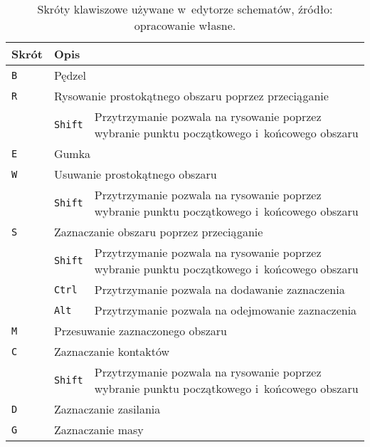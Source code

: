 \begin{table}[h]
    \centering
    \caption[Skróty klawiszowe używane w~edytorze schematów.]
    {Skróty klawiszowe używane w~edytorze schematów, źródło: opracowanie własne.}
    \label{tab:key_shortcuts}
    \begin{tabular}{|l||l|p{}|}
        \hline
        Skrót & \multicolumn{2}{|l|}{Opis} \\
        \hline
        \hline
        \texttt{B} & \multicolumn{2}{|l|}{Pędzel} \\
        \hline
        \texttt{R} & \multicolumn{2}{|l|}{Rysowanie prostokątnego obszaru poprzez przeciąganie} \\
        \cline{2-3}
        & \texttt{Shift} & Przytrzymanie pozwala na rysowanie poprzez wybranie punktu początkowego i~końcowego obszaru \\
        \hline
        \texttt{E} & \multicolumn{2}{|l|}{Gumka} \\
        \hline
        \texttt{W} & \multicolumn{2}{|l|}{Usuwanie prostokątnego obszaru} \\
        \cline{2-3}
        & \texttt{Shift} & Przytrzymanie pozwala na rysowanie poprzez wybranie punktu początkowego i~końcowego obszaru \\
        \hline
        \texttt{S} & \multicolumn{2}{|l|}{Zaznaczanie obszaru poprzez przeciąganie} \\
        \cline{2-3}
        & \texttt{Shift} & Przytrzymanie pozwala na rysowanie poprzez wybranie punktu początkowego i~końcowego obszaru \\
        \cline{2-3}
        & \texttt{Ctrl} & Przytrzymanie pozwala na dodawanie zaznaczenia \\
        \cline{2-3}
        & \texttt{Alt} & Przytrzymanie pozwala na odejmowanie zaznaczenia \\
        \hline
        \texttt{M} & \multicolumn{2}{|l|}{Przesuwanie zaznaczonego obszaru} \\
        \hline
        \texttt{C} & \multicolumn{2}{|l|}{Zaznaczanie kontaktów} \\
        \cline{2-3}
        & \texttt{Shift} & Przytrzymanie pozwala na rysowanie poprzez wybranie punktu początkowego i~końcowego obszaru \\
        \hline
        \texttt{D} & \multicolumn{2}{|l|}{Zaznaczanie zasilania} \\
        \hline
        \texttt{G} & \multicolumn{2}{|l|}{Zaznaczanie masy} \\
        \hline

\end{tabular}
\end{table}
